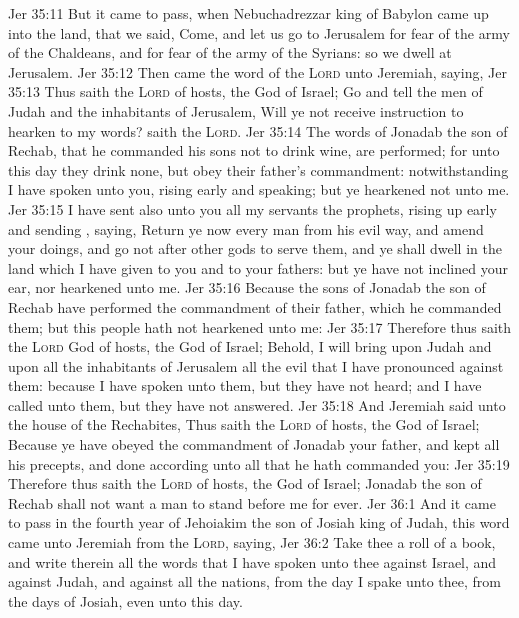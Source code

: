 \vs Jer 35:11 But it came to pass, when Nebuchadrezzar king of Babylon came up into the land, that we said, Come, and let us go to Jerusalem for fear of the army of the Chaldeans, and for fear of the army of the Syrians: so we dwell at Jerusalem.
\vs Jer 35:12 Then came the word of the \textsc{Lord} unto Jeremiah, saying,
\vs Jer 35:13 Thus saith the \textsc{Lord} of hosts, the God of Israel; Go and tell the men of Judah and the inhabitants of Jerusalem, Will ye not receive instruction to hearken to my words? saith the \textsc{Lord}.
\vs Jer 35:14 The words of Jonadab the son of Rechab, that he commanded his sons not to drink wine, are performed; for unto this day they drink none, but obey their father's commandment: notwithstanding I have spoken unto you, rising early and speaking; but ye hearkened not unto me.
\vs Jer 35:15 I have sent also unto you all my servants the prophets, rising up early and sending , saying, Return ye now every man from his evil way, and amend your doings, and go not after other gods to serve them, and ye shall dwell in the land which I have given to you and to your fathers: but ye have not inclined your ear, nor hearkened unto me.
\vs Jer 35:16 Because the sons of Jonadab the son of Rechab have performed the commandment of their father, which he commanded them; but this people hath not hearkened unto me:
\vs Jer 35:17 Therefore thus saith the \textsc{Lord} God of hosts, the God of Israel; Behold, I will bring upon Judah and upon all the inhabitants of Jerusalem all the evil that I have pronounced against them: because I have spoken unto them, but they have not heard; and I have called unto them, but they have not answered.
\vs Jer 35:18 And Jeremiah said unto the house of the Rechabites, Thus saith the \textsc{Lord} of hosts, the God of Israel; Because ye have obeyed the commandment of Jonadab your father, and kept all his precepts, and done according unto all that he hath commanded you:
\vs Jer 35:19 Therefore thus saith the \textsc{Lord} of hosts, the God of Israel; Jonadab the son of Rechab shall not want a man to stand before me for ever.
\vs Jer 36:1 And it came to pass in the fourth year of Jehoiakim the son of Josiah king of Judah,  this word came unto Jeremiah from the \textsc{Lord}, saying,
\vs Jer 36:2 Take thee a roll of a book, and write therein all the words that I have spoken unto thee against Israel, and against Judah, and against all the nations, from the day I spake unto thee, from the days of Josiah, even unto this day.
